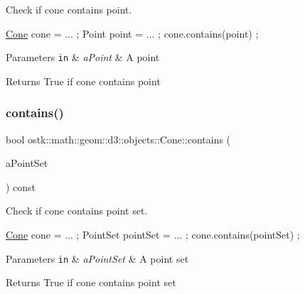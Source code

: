 Check if cone contains point. 


\begin{DoxyCode}
\hyperlink{classostk_1_1math_1_1geom_1_1d3_1_1objects_1_1_cone_ac86773a78cf513900e8b0d3a2709bfcb}{Cone} cone = ... ;
Point point = ... ;
cone.contains(point) ;
\end{DoxyCode}



\begin{DoxyParams}[1]{Parameters}
\mbox{\tt in}  & {\em a\+Point} & A point \\
\hline
\end{DoxyParams}
\begin{DoxyReturn}{Returns}
True if cone contains point 
\end{DoxyReturn}
\mbox{\label{classostk_1_1math_1_1geom_1_1d3_1_1objects_1_1_cone_a53bb7e13d8605a4eadee965c04ee9686}} 
\subsubsection{\texorpdfstring{contains()}{contains()}\hspace{0.1cm}{\footnotesize\ttfamily [2/6]}}
{\footnotesize\ttfamily bool ostk\+::math\+::geom\+::d3\+::objects\+::\+Cone\+::contains (\begin{DoxyParamCaption}\item[{const \hyperlink{classostk_1_1math_1_1geom_1_1d3_1_1objects_1_1_point_set}{Point\+Set} \&}]{a\+Point\+Set }\end{DoxyParamCaption}) const}



Check if cone contains point set. 


\begin{DoxyCode}
\hyperlink{classostk_1_1math_1_1geom_1_1d3_1_1objects_1_1_cone_ac86773a78cf513900e8b0d3a2709bfcb}{Cone} cone = ... ;
PointSet pointSet = ... ;
cone.contains(pointSet) ;
\end{DoxyCode}



\begin{DoxyParams}[1]{Parameters}
\mbox{\tt in}  & {\em a\+Point\+Set} & A point set \\
\hline
\end{DoxyParams}
\begin{DoxyReturn}{Returns}
True if cone contains point set 
\end{DoxyReturn}
\mbox{\label{classostk_1_1math_1_1geom_1_1d3_1_1objects_1_1_cone_aee26d5436e5095021948ed7d1dbd7638}} 
